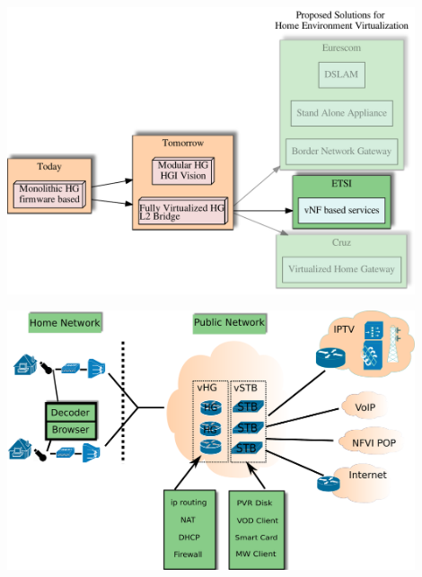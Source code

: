 \documentclass[a4paper]{beamer}
\begin{document}
\begin{frame}{}
	\includegraphics[width=0.9\textwidth]{vhgtrends-etsi-emphasis.pdf}
\end{frame}

\begin{frame}{}
	\begin{centering}
		\includegraphics[width=0.9\textwidth]{etsi-virtualisation-home-env.pdf}
	\end{centering}
			
\end{frame}
\end{document}
